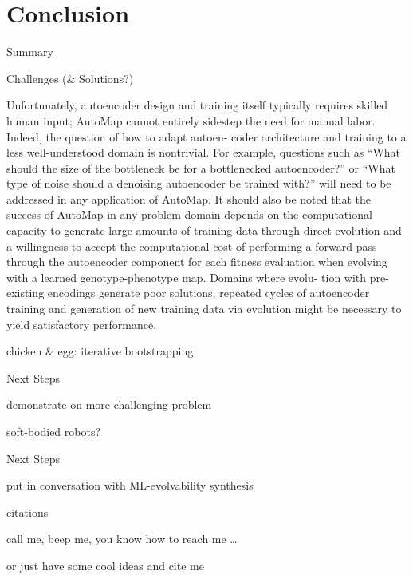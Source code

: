 \section{Conclusion}

\begin{frame}{Summary}

\end{frame}

\begin{frame}{Challenges (\& Solutions?)}

Unfortunately, autoencoder design and training itself typically
requires skilled human input; AutoMap cannot entirely sidestep the
need for manual labor. Indeed, the question of how to adapt autoen-
coder architecture and training to a less well-understood domain is
nontrivial. For example, questions such as “What should the size
of the bottleneck be for a bottlenecked autoencoder?” or “What
type of noise should a denoising autoencoder be trained with?”
will need to be addressed in any application of AutoMap. It should
also be noted that the success of AutoMap in any problem domain
depends on the computational capacity to generate large amounts
of training data through direct evolution and a willingness to accept
the computational cost of performing a forward pass through the
autoencoder component for each fitness evaluation when evolving
with a learned genotype-phenotype map. Domains where evolu-
tion with pre-existing encodings generate poor solutions, repeated
cycles of autoencoder training and generation of new training data
via evolution might be necessary to yield satisfactory performance.

chicken \& egg: iterative bootstrapping

\end{frame}

\begin{frame}{Next Steps}

demonstrate on more challenging problem

soft-bodied robots?

\end{frame}

\begin{frame}{Next Steps}

put in conversation with ML-evolvability synthesis

citations

call me, beep me, you know how to reach me \dots

or just have some cool ideas and cite me

\end{frame}
